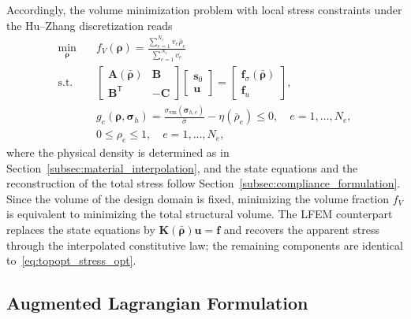 Accordingly, the volume minimization problem with local stress constraints under the Hu--Zhang discretization reads
\begin{equation}
\label{eq:topopt_stress_opt}
\begin{aligned}
\min_{\boldsymbol{\rho}} \quad & f_V(\boldsymbol{\rho})
= \frac{\sum_{e=1}^{N_e} v_e \bar{\rho}_e}{\sum_{e=1}^{N_e} v_e} \\
\text{s.t.} \quad &
\begin{bmatrix} \boldsymbol{A}(\bar{\boldsymbol{\rho}}) & \boldsymbol{B} \\ \boldsymbol{B}^{\mathsf T} & -\boldsymbol{C} \end{bmatrix}
\begin{bmatrix} \boldsymbol{s}_0 \\ \boldsymbol{u} \end{bmatrix}
= \begin{bmatrix} \boldsymbol{f}_\sigma(\bar{\boldsymbol{\rho}}) \\ \boldsymbol{f}_u \end{bmatrix}, \\
& g_e(\boldsymbol{\rho}, \boldsymbol{\sigma}_h)
= \frac{\sigma_{\mathrm{vm}}(\boldsymbol{\sigma}_{h,e})}{\bar{\sigma}} - \eta(\bar{\rho}_e) \le 0,
\quad e = 1, \dots, N_e, \\
& 0 \le \rho_e \le 1, \quad e = 1, \dots, N_e,
\end{aligned}
\end{equation}
where the physical density is determined as in Section~\ref{subsec:material_interpolation}, and the state equations and the reconstruction of the total stress follow Section~\ref{subsec:compliance_formulation}. Since the volume of the design domain is fixed, minimizing the volume fraction $f_V$ is equivalent to minimizing the total structural volume. The LFEM counterpart replaces the state equations by $\boldsymbol{K}(\bar{\boldsymbol{\rho}}) \boldsymbol{u} = \boldsymbol{f}$ and recovers the apparent stress through the interpolated constitutive law; the remaining components are identical to~\eqref{eq:topopt_stress_opt}.

\subsection{Augmented Lagrangian Formulation}
\label{subsec:augmented_lagrangian}

